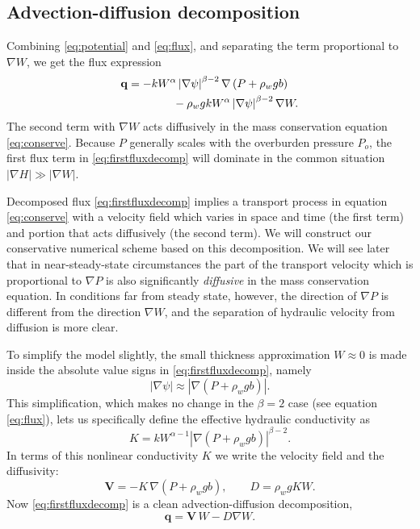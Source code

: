 \documentclass[gmd]{copernicus}   %
\newcommand\bV{\mathbf{V}}
\newcommand\bq{\mathbf{q}}
\newcommand{\grad}{\nabla}
\begin{document}
\subsection{Advection-diffusion decomposition}  Combining \eqref{eq:potential} and \eqref{eq:flux}, and separating the term proportional to $\grad W$, we get the flux expression
\begin{align}
\bq &= - k  W^\alpha \left|\grad \psi\right|^{\beta-2} \grad \left(P + \rho_w g b\right)  \label{eq:firstfluxdecomp} \\
    &\qquad\qquad - \rho_w g k W^\alpha \left|\grad \psi\right|^{\beta-2} \grad W.  \notag
\end{align}
The second term with $\grad W$ acts diffusively in the mass conservation equation \eqref{eq:conserve}.  Because $P$ generally scales with the overburden pressure $P_o$, the first flux term in \eqref{eq:firstfluxdecomp} will dominate in the common situation $|\grad H| \gg |\grad W|$.

Decomposed flux \eqref{eq:firstfluxdecomp} implies a transport process in equation \eqref{eq:conserve} with a velocity field which varies in space and time (the first term) and portion that acts diffusively (the second term).  We will construct our conservative numerical scheme based on this decomposition.  We will see later that in near-steady-state circumstances the part of the transport velocity which is proportional to $\grad P$ is also significantly \emph{diffusive} in the mass conservation equation.  In conditions far from steady state, however, the direction of $\grad P$ is different from the direction $\grad W$, and the separation of hydraulic velocity from diffusion is more clear.

To simplify the model slightly, the small thickness approximation $W\approx 0$ is made inside the absolute value signs in \eqref{eq:firstfluxdecomp}, namely
\begin{equation}
\left|\grad \psi\right| \approx \left|\grad \left(P + \rho_w g b \right)\right|.  \label{eq:Wsmall}
\end{equation}
This simplification, which makes no change in the $\beta=2$ case (see equation \eqref{eq:flux}), lets us specifically define the effective hydraulic conductivity as
\begin{equation}
K = k W^{\alpha-1} \left|\grad(P+\rho_w g b)\right|^{\beta - 2}. \label{eq:Kdefine}
\end{equation}
In terms of this nonlinear conductivity $K$ we write the velocity field and the diffusivity:
\begin{equation} \label{eq:vexpression}
  \bV = - K\, \grad \left(P + \rho_w g b\right), \qquad D = \rho_w g K W.
\end{equation}
Now \eqref{eq:firstfluxdecomp} is a clean advection-diffusion decomposition,
\begin{equation} \label{eq:qexpression}
  \bq = \bV\, W - D \grad W.
\end{equation}
\end{document}
